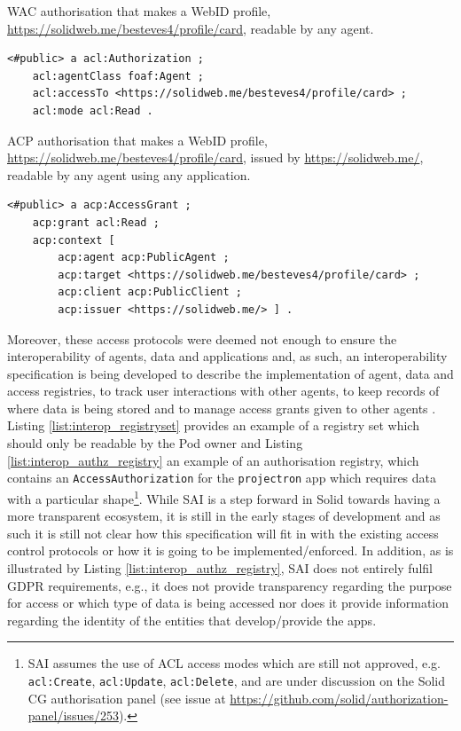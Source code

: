 \begin{listing}[h]
\caption{WAC authorisation that makes a WebID profile, \url{https://solidweb.me/besteves4/profile/card}, readable by any agent.}
\label{list:wac}
\begin{verbatim}
<#public> a acl:Authorization ;
    acl:agentClass foaf:Agent ;
    acl:accessTo <https://solidweb.me/besteves4/profile/card> ;
    acl:mode acl:Read .
\end{verbatim}
\end{listing}

\begin{listing}[h]
\caption{ACP authorisation that makes a WebID profile, \url{https://solidweb.me/besteves4/profile/card}, issued by \url{https://solidweb.me/}, readable by any agent using any application.}
\label{list:acp}
\begin{verbatim}
<#public> a acp:AccessGrant ;
    acp:grant acl:Read ;
    acp:context [
        acp:agent acp:PublicAgent ;
        acp:target <https://solidweb.me/besteves4/profile/card> ;
        acp:client acp:PublicClient ;
        acp:issuer <https://solidweb.me/> ] .
\end{verbatim}
\end{listing}

Moreover, these access protocols were deemed not enough to ensure the interoperability of agents, data and applications and, as such, an interoperability specification is being developed to describe the implementation of agent, data and access registries, to track user interactions with other agents, to keep records of where data is being stored and to manage access grants given to other agents \citep{bingham_interop_2023}.
Listing \ref{list:interop_registryset} provides an example of a registry set which should only be readable by the Pod owner and Listing \ref{list:interop_authz_registry} an example of an authorisation registry, which contains an \texttt{AccessAuthorization} for the \texttt{projectron} app which requires data with a particular shape\footnote{SAI assumes the use of ACL access modes which are still not approved, e.g. \texttt{acl:Create}, \texttt{acl:Update}, \texttt{acl:Delete}, and are under discussion on the Solid CG authorisation panel (see issue at \url{https://github.com/solid/authorization-panel/issues/253}).}. While SAI is a step forward in Solid towards having a more transparent ecosystem, it is still in the early stages of development and as such it is still not clear how this specification will fit in with the existing access control protocols or how it is going to be implemented/enforced.
In addition, as is illustrated by Listing \ref{list:interop_authz_registry}, SAI does not entirely fulfil GDPR requirements, e.g., it does not provide transparency regarding the purpose for access or which type of data is being accessed nor does it provide information regarding the identity of the entities that develop/provide the apps.

